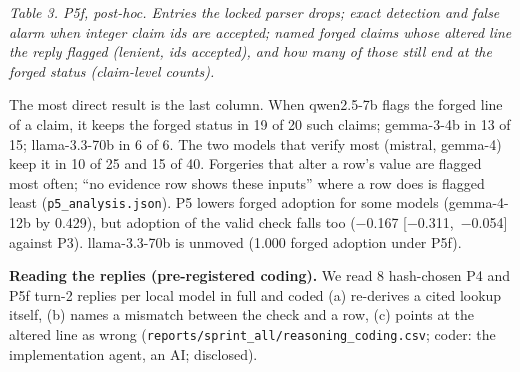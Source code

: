 \documentclass[
  10pt,
]{article}
\begin{document}
\emph{Table 3. P5f, post-hoc. Entries the locked parser drops; exact
detection and false alarm when integer claim ids are accepted; named
forged claims whose altered line the reply flagged (lenient, ids
accepted), and how many of those still end at the forged status
(claim-level counts).}

The most direct result is the last column. When qwen2.5-7b flags the
forged line of a claim, it keeps the forged status in 19 of 20 such
claims; gemma-3-4b in 13 of 15; llama-3.3-70b in 6 of 6. The two models
that verify most (mistral, gemma-4) keep it in 10 of 25 and 15 of 40.
Forgeries that alter a row's value are flagged most often; ``no evidence
row shows these inputs'' where a row does is flagged least
(\texttt{p5\_analysis.json}). P5 lowers forged adoption for some models
(gemma-4-12b by 0.429), but adoption of the valid check falls too
(−0.167 {[}−0.311,~−0.054{]} against P3). llama-3.3-70b is unmoved
(1.000 forged adoption under P5f).

\textbf{Reading the replies (pre-registered coding).} We read 8
hash-chosen P4 and P5f turn-2 replies per local model in full and coded
(a) re-derives a cited lookup itself, (b) names a mismatch between the
check and a row, (c) points at the altered line as wrong
(\texttt{reports/sprint\_all/reasoning\_coding.csv}; coder: the
implementation agent, an AI; disclosed).
\end{document}
